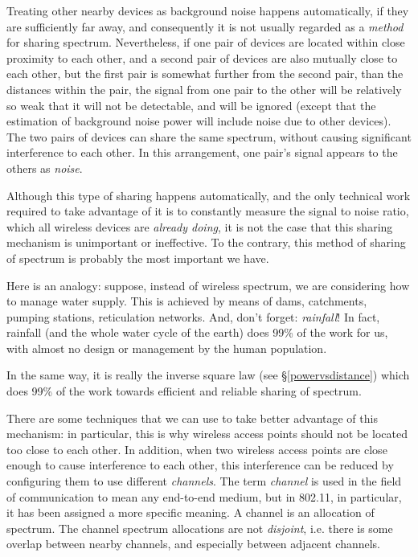 Treating other nearby devices as background noise happens automatically, if they are sufficiently far away,
and consequently it is not usually regarded as a {\em method} for sharing spectrum.
Nevertheless, if one pair of devices are located within close proximity to each other,
and a second pair of devices are also mutually close to each other, but the first pair
is somewhat further from the second pair, than the distances within the pair,
the signal from one pair to the other will be relatively so weak that it will not be detectable, and will
be ignored (except that the estimation of background noise power will include noise due to 
other devices). 
The two pairs of devices can share the same spectrum, without causing significant
interference to each other. In this arrangement, one pair's signal appears to the others 
as {\em noise}.

Although this type of sharing happens automatically, and the only technical work required
to take advantage of it is to constantly measure the signal to noise ratio, which all wireless
devices are {\em already doing}, it is not the case that this sharing mechanism is unimportant or
ineffective. To the contrary, this method of sharing of spectrum is probably the most important
we have.

Here is an analogy: suppose, instead of wireless spectrum, we are considering how to manage 
water supply. This is achieved by means of dams, catchments, pumping stations, reticulation networks.
And, don't forget: {\em rainfall}! In fact, rainfall (and the whole water cycle of the earth) 
does 99\% of the work for us, with almost no design or management by the human population.

In the same way, it is really the inverse square law (see \S\ref{powervsdistance}) which 
does 99\% of the work towards efficient and reliable sharing of spectrum.

There are some techniques that we can use to take better advantage of this mechanism:
in particular, this is why wireless access points should not be located too close
to each other. In addition, when two wireless access points are close enough
to cause interference to each other, this interference can be reduced by 
configuring them to use different {\em channels}. The term {\em channel} is
used in the field of communication to mean any end-to-end medium, but in 
802.11, in particular, it has been assigned a more specific meaning. A channel
is an allocation of spectrum. The channel spectrum allocations are not
{\em disjoint}, i.e. there is some overlap between nearby channels, and
especially between adjacent channels.

